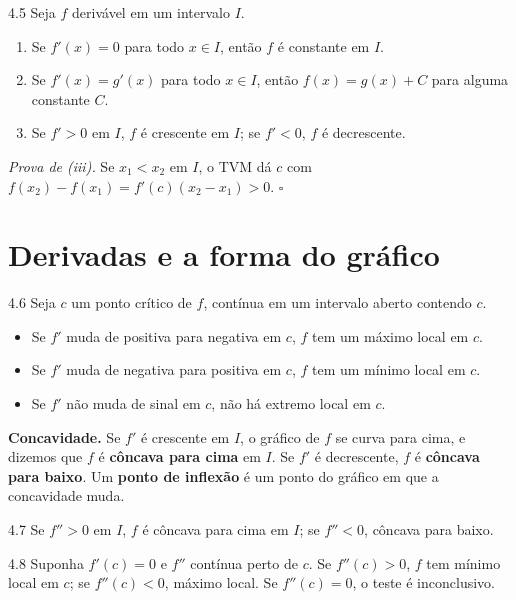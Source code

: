\begin{teorema}{4.5}
Seja $f$ derivável em um intervalo $I$.
\begin{enumerate}[label=(\roman*)]
\item Se $f'(x)=0$ para todo $x\in I$, então $f$ é constante em $I$.
\item Se $f'(x)=g'(x)$ para todo $x\in I$, então $f(x)=g(x)+C$ para alguma constante $C$.
\item Se $f'>0$ em $I$, $f$ é crescente em $I$; se $f'<0$, $f$ é decrescente.
\end{enumerate}
\end{teorema}
\emph{Prova de (iii).} Se $x_1<x_2$ em $I$, o TVM dá $c$ com
$f(x_2)-f(x_1)=f'(c)(x_2-x_1)>0$. $\square$

\section{Derivadas e a forma do gráfico}

\begin{teorema}{4.6}
Seja $c$ um ponto crítico de $f$, contínua em um intervalo aberto contendo $c$.
\begin{itemize}
\item Se $f'$ muda de positiva para negativa em $c$, $f$ tem um máximo local em $c$.
\item Se $f'$ muda de negativa para positiva em $c$, $f$ tem um mínimo local em $c$.
\item Se $f'$ não muda de sinal em $c$, não há extremo local em $c$.
\end{itemize}
\end{teorema}

\textbf{Concavidade.} Se $f'$ é crescente em $I$, o gráfico de $f$ se curva para cima, e
dizemos que $f$ é \textbf{côncava para cima} em $I$. Se $f'$ é decrescente, $f$ é
\textbf{côncava para baixo}. Um \textbf{ponto de inflexão} é um ponto do gráfico em que a
concavidade muda.

\begin{teorema}{4.7}
Se $f''>0$ em $I$, $f$ é côncava para cima em $I$; se $f''<0$, côncava para baixo.
\end{teorema}

\begin{teorema}{4.8}
Suponha $f'(c)=0$ e $f''$ contínua perto de $c$. Se $f''(c)>0$, $f$ tem mínimo local em $c$;
se $f''(c)<0$, máximo local. Se $f''(c)=0$, o teste é inconclusivo.
\end{teorema}

